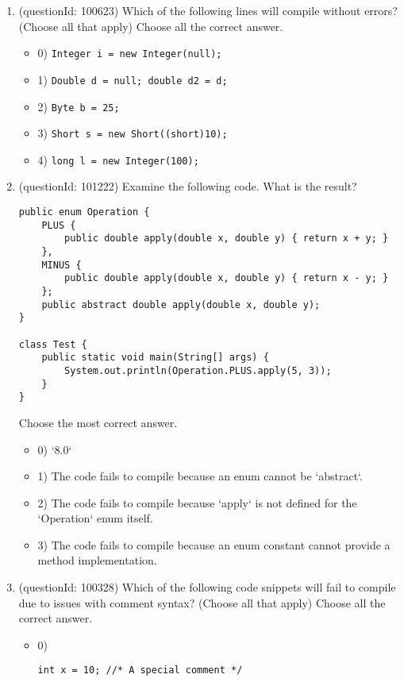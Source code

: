 \documentclass[12pt]{article}
\begin{document}
\begin{enumerate}[label=(\arabic*)]
\begin{itemize}
\end{itemize}
\item (questionId: 100623) Which of the following lines will compile without errors? (Choose all that apply)
Choose all the correct answer.\begin{itemize}
\item 0) \verb|Integer i = new Integer(null);|

\item 1) \verb|Double d = null; double d2 = d;|

\item 2) \verb|Byte b = 25; |

\item 3) \verb|Short s = new Short((short)10);|

\item 4) \verb|long l = new Integer(100);|

\end{itemize}
\item (questionId: 101222) Examine the following code. What is the result?
\begin{verbatim}
public enum Operation {
    PLUS {
        public double apply(double x, double y) { return x + y; }
    },
    MINUS {
        public double apply(double x, double y) { return x - y; }
    };
    public abstract double apply(double x, double y);
}

class Test {
    public static void main(String[] args) {
        System.out.println(Operation.PLUS.apply(5, 3));
    }
}
\end{verbatim}
Choose the most correct answer. 
\begin{itemize}
\item 0) `8.0`

\item 1) The code fails to compile because an enum cannot be `abstract`.

\item 2) The code fails to compile because `apply` is not defined for the `Operation` enum itself.

\item 3) The code fails to compile because an enum constant cannot provide a method implementation.

\end{itemize}
\item (questionId: 100328) Which of the following code snippets will fail to compile due to issues with comment syntax? (Choose all that apply)
Choose all the correct answer.\begin{itemize}
\item 0) \begin{verbatim}
int x = 10; //* A special comment */
\end{verbatim}


\end{itemize}
\end{enumerate}
\end{document}
